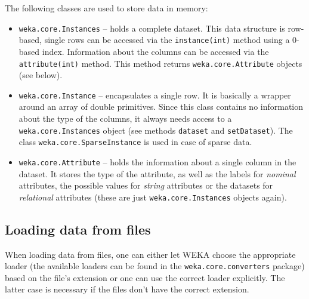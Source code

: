 The following classes are used to store data in memory:
\begin{itemize}
	\item \texttt{weka.core.Instances} -- holds a complete dataset. This data
structure is row-based, single rows can be accessed via the
\texttt{instance(int)} method using a 0-based index. Information about the
columns can be accessed via the \texttt{attribute(int)} method. This method
returns \texttt{weka.core.Attribute} objects (see below).
	\item \texttt{weka.core.Instance} -- encapsulates a single row. It is
basically a wrapper around an array of double primitives. Since this class
contains no information about the type of the columns, it always needs access
to a \texttt{weka.core.Instances} object (see methods \texttt{dataset} and
\texttt{setDataset}). The class \texttt{weka.core.SparseInstance} is used in
case of sparse data.
	\item \texttt{weka.core.Attribute} -- holds the information about a single
column in the dataset. It stores the type of the attribute, as well as the
labels for \textit{nominal} attributes, the possible values for \textit{string}
attributes or the datasets for \textit{relational} attributes (these are just
\texttt{weka.core.Instances} objects again).
\end{itemize}

\subsection{Loading data from files}
When loading data from files, one can either let WEKA choose the appropriate
loader (the available loaders can be found in the \texttt{weka.core.converters}
package) based on the file's extension or one can use the correct loader
explicitly. The latter case is necessary if the files don't have the correct
extension.

